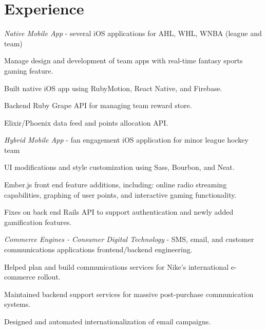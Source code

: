 \documentclass[]{deedy-resume-openfont}
\begin{document}
\hfill
\begin{minipage}[t]{0.66\textwidth} 


\section{Experience}

\textit{Native Mobile App} - several iOS applications for AHL, WHL, WNBA (league and team)
\vspace{\topsep} %
\begin{tightemize}
\item Manage design and development of team apps with real-time fantasy sports gaming feature.
\item Built native iOS app using RubyMotion, React Native, and Firebase.
\item Backend Ruby Grape API for managing team reward store.
\item Elixir/Phoenix data feed and points allocation API.
\end{tightemize}
\sectionsep

\textit{Hybrid Mobile App} - fan engagement iOS application for minor league hockey team
\begin{tightemize}
\item UI modifications and style customization using Sass, Bourbon, and Neat.
\item Ember.js front end feature additions, including: online radio streaming capabilities, graphing of user points, and interactive gaming functionality.
\item Fixes on back end Rails API to support authentication and newly added gamification features.
\end{tightemize}
\sectionsep

\textit{Commerce Engines - Consumer Digital Technology} - SMS, email, and customer communications applications frontend/backend engineering.
\begin{tightemize}
\item Helped plan and build communications services for Nike's international e-commerce rollout.
\item Maintained backend support services for massive post-purchase communication systems.
\item Designed and automated internationalization of email campaigns.
\end{tightemize}
\sectionsep


\end{minipage}
\end{document}
